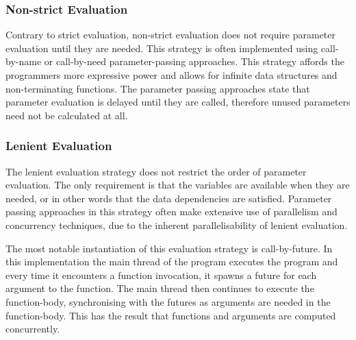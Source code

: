 \subsubsection{Non-strict Evaluation}
Contrary to strict evaluation, non-strict evaluation does not require parameter evaluation until they are needed\cite{hudak1989conception}. This strategy is often implemented using call-by-name or call-by-need parameter-passing approaches. This strategy affords the programmers more expressive power\cite{bird1997more} and allows for infinite data structures and non-terminating functions\cite[p.~103]{huttel2010transitions}. The parameter passing approaches state that parameter evaluation is delayed until they are called, therefore unused parameters need not be calculated at all.

\subsubsection{Lenient Evaluation}
The lenient evaluation strategy does not restrict the order of parameter evaluation. The only requirement is that the variables are available when they are needed, or in other words that the data dependencies are satisfied. Parameter passing approaches in this strategy often make extensive use of parallelism and concurrency techniques, due to the inherent parallelisability of lenient evaluation\cite{DBLP:journals/cl/Tremblay-parallel}.

The most notable instantiation of this evaluation strategy is call-by-future\cite{baker1977incremental}. In this implementation the main thread of the program executes the program and every time it encounters a function invocation, it spawns a future for each argument to the function. The main thread then continues to execute the function-body, synchronising with the futures as arguments are needed in the function-body. This has the result that functions and arguments are computed concurrently.


